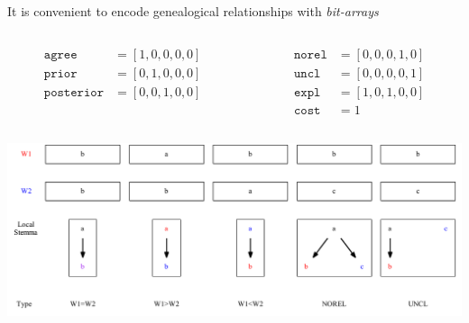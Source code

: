 \documentclass[10pt]{beamer}
\begin{document}
	\begin{frame}
		It is convenient to encode genealogical relationships with \emph{bit-arrays}
		\begin{columns}
			\begin{column}{0.45\textwidth}
				\begin{align*}
					\mathtt{agree} &= [1,0,0,0,0]\\
					\mathtt{prior} &= [0,1,0,0,0]\\
					\mathtt{posterior} &= [0,0,1,0,0]\\
					\phantom{*}
				\end{align*}
			\end{column}
			\begin{column}{0.45\textwidth}
				\begin{align*}
					\mathtt{norel} &= [0,0,0,1,0]\\
					\mathtt{uncl} &= [0,0,0,0,1]\\
					\mathtt{expl} &= [1,0,1,0,0]\\
					\mathtt{cost} &= 1
				\end{align*}
			\end{column}
		\end{columns}
		\begin{center}
			\includegraphics[width=\textwidth]{../img/genealogical-relationships.pdf}
		\end{center}
	\end{frame}
\end{document}
